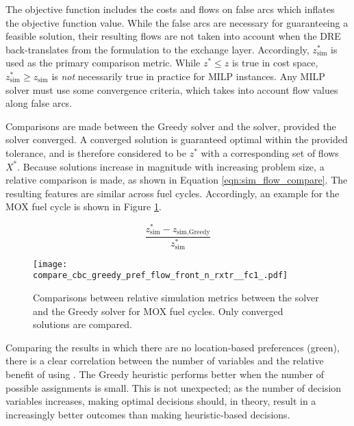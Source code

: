The objective function includes the costs and flows on false arcs which inflates
the objective function value. While the false arcs are necessary for
guaranteeing a feasible solution, their resulting flows are not taken into
account when the DRE back-translates from the formulation to the exchange
layer. Accordingly, $z^*_{\text{sim}}$ is used as the primary comparison
metric. While $z^* \leq z$ is true in cost space, $z^*_{\text{sim}} \geq
z_{\text{sim}}$ is \textit{not} necessarily true in practice for MILP
instances. Any MILP solver must use some convergence criteria, which takes into
account flow values along false arcs.

Comparisons are made between the Greedy solver and the \cbc solver, provided the
\cbc solver converged. A converged \cbc solution is guaranteed optimal within
the provided tolerance, and is therefore considered to be $z^*$ with a
corresponding set of flows $X^*$. Because solutions increase in magnitude with
increasing problem size, a relative comparison is made, as shown in Equation
\ref{eqn:sim_flow_compare}. The resulting features are similar across fuel
cycles. Accordingly, an example for the MOX fuel cycle is shown in Figure
\ref{fig:compare_cbc_greedy_pref_flow_front_n_rxtr__fc1_}.

\begin{equation}\label{eqn:sim_flow_compare}
\frac{z^*_{\text{sim}} - z_{\text{sim}, \text{Greedy}}}
     {z^*_{\text{sim}}} 
\end{equation}

\begin{figure}[h!]
  \begin{center}
    \texttt{[image: compare\_cbc\_greedy\_pref\_flow\_front\_n\_rxtr\_\_fc1\_.pdf]}
    \caption{
      \label{fig:compare_cbc_greedy_pref_flow_front_n_rxtr__fc1_}
      Comparisons between relative simulation metrics between the \cbc solver and
      the Greedy solver for MOX fuel cycles. Only converged \cbc
      solutions are compared.  }
  \end{center}
\end{figure}

Comparing the results in which there are no location-based preferences (green),
there is a clear correlation between the number of variables and the relative
benefit of using \cbc. The Greedy heuristic performs better when the number of
possible assignments is small. This is not unexpected; as the number of decision
variables increases, making optimal decisions should, in theory, result in a
increasingly better outcomes than making heuristic-based decisions. 


